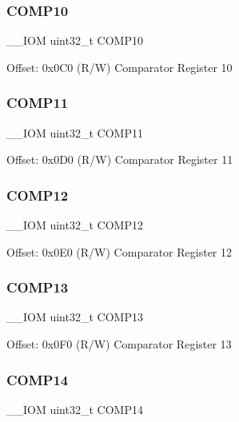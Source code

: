 \subsubsection{\texorpdfstring{COMP10}{COMP10}}
{\footnotesize\ttfamily \+\_\+\+\_\+\+I\+OM uint32\+\_\+t C\+O\+M\+P10}

Offset\+: 0x0\+C0 (R/W) Comparator Register 10 \mbox{\label{struct_d_w_t___type_ab5e5be1f4cce832413b02bd6eb8175f6}} 
\subsubsection{\texorpdfstring{COMP11}{COMP11}}
{\footnotesize\ttfamily \+\_\+\+\_\+\+I\+OM uint32\+\_\+t C\+O\+M\+P11}

Offset\+: 0x0\+D0 (R/W) Comparator Register 11 \mbox{\label{struct_d_w_t___type_a73bbb409205cd8ae8438c8a58998d205}} 
\subsubsection{\texorpdfstring{COMP12}{COMP12}}
{\footnotesize\ttfamily \+\_\+\+\_\+\+I\+OM uint32\+\_\+t C\+O\+M\+P12}

Offset\+: 0x0\+E0 (R/W) Comparator Register 12 \mbox{\label{struct_d_w_t___type_a8e7c69cbac19ef0b26b0ae0cc928da36}} 
\subsubsection{\texorpdfstring{COMP13}{COMP13}}
{\footnotesize\ttfamily \+\_\+\+\_\+\+I\+OM uint32\+\_\+t C\+O\+M\+P13}

Offset\+: 0x0\+F0 (R/W) Comparator Register 13 \mbox{\label{struct_d_w_t___type_af5930659b3107c17fa71e61803d63f97}} 
\subsubsection{\texorpdfstring{COMP14}{COMP14}}
{\footnotesize\ttfamily \+\_\+\+\_\+\+I\+OM uint32\+\_\+t C\+O\+M\+P14}

